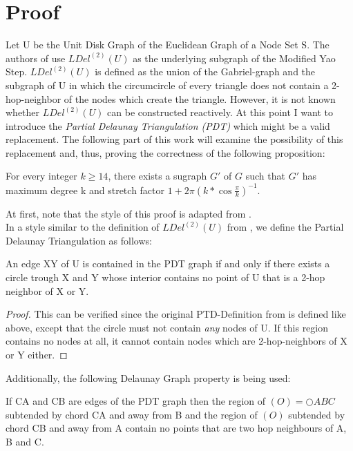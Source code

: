 \section{Proof}
Let U be the Unit Disk Graph of the Euclidean Graph of a Node Set S.
The authors of \cite{kanj} use $LDel^{(2)}(U) $ as the underlying subgraph of the Modified Yao Step.
$LDel^{(2)}(U) $ is defined as the union of the Gabriel-graph and the subgraph of U in which the circumcircle of every triangle does not contain a 2-hop-neighbor of the nodes which create the triangle.
However, it is not known whether $LDel^{(2)}(U) $ can be constructed reactively.
At this point I want to introduce the \emph{Partial Delaunay Triangulation (PDT)} \cite{pdt} which might be a valid replacement.
The following part of this work will examine the possibility of this replacement and, thus, proving the correctness of the following proposition:
\begin{prop}
For every integer $k \geq 14 $, there exists a sugraph $G' $ of $G $ such that $G' $ has maximum degree k and stretch factor $1+2\pi (k*\cos{\frac{\pi}{k}})^{-1} $.
\end{prop}

At first, note that the style of this proof is adapted from \cite{kanj}.\\
In a style similar to the definition of $LDel^{(2)}(U) $ from \cite{kanj}, we define the Partial Delaunay Triangulation as follows:
\begin{definition}
\label{emptycircle}
An edge XY of U is contained in the PDT graph if and only if there exists a circle trough X and Y whose interior contains no point of U that is a 2-hop neighbor of X or Y.
\end{definition}
\begin{proof}
This can be verified since the original PTD-Definition from \cite{pdt} is defined like above, except that the circle must not contain \emph{any} nodes of U. 
If this region contains no nodes at all, it cannot contain nodes which are 2-hop-neighbors of X or Y either.  
\end{proof}

Additionally, the following Delaunay Graph property is being used:
\begin{lemma}
\label{emptyregion}
If CA and CB are edges of the PDT graph then the region of $(O)=\bigcirc{ABC} $ subtended by chord  CA and away from B and the region of $(O) $ subtended by chord CB and away from A contain no points that are two hop neighbours of A, B and C.
\end{lemma}


